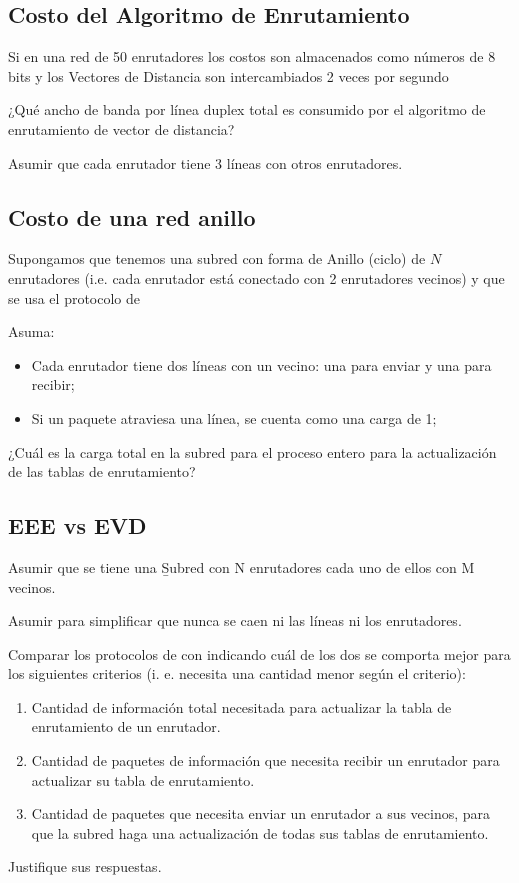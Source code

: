 \documentclass[12pt]{report}
\begin{document}
\begin{exer}
\subsection{Costo del Algoritmo de Enrutamiento \sthree}
Si en una red de 50 enrutadores los costos son almacenados como números de 8 bits y los
Vectores de Distancia son intercambiados 2 veces por segundo

¿Qué ancho de banda por línea duplex total es consumido por el algoritmo de enrutamiento de vector de distancia?

Asumir que cada enrutador tiene 3 líneas con otros enrutadores.
\end{exer}

\begin{exer}
\subsection{Costo de una red anillo \sthree}
Supongamos que tenemos una subred con forma de Anillo (ciclo) de $N$ enrutadores (i.e.
cada enrutador está conectado con 2 enrutadores vecinos) y que se usa el protocolo de 

Asuma:
\begin{itemize}
\item Cada enrutador tiene dos líneas con un vecino: una para enviar y una para recibir;
\item Si un paquete atraviesa una línea, se cuenta como una carga de 1;
\end{itemize}
¿Cuál es la carga total en la subred para el proceso entero para la actualización de las tablas
de enrutamiento?
\end{exer}

\begin{exer}
\subsection{EEE vs EVD \sthree}
Asumir que se tiene una \b{Subred con N enrutadores cada uno de ellos con M vecinos}.

Asumir para simplificar que nunca se caen ni las líneas ni los enrutadores.

Comparar los protocolos de  con  indicando cuál de los dos se comporta mejor para los siguientes criterios (i. e. necesita
una cantidad menor según el criterio):

\begin{enumerate}
\item Cantidad de información total necesitada para actualizar la tabla de enrutamiento de un
enrutador.
\item Cantidad de paquetes de información que necesita recibir un enrutador para actualizar
su tabla de enrutamiento.
\item Cantidad de paquetes que necesita enviar un enrutador a sus vecinos, para que la subred
haga una actualización de todas sus tablas de enrutamiento.
\end{enumerate}

Justifique sus respuestas.
\end{exer}
\end{document}
